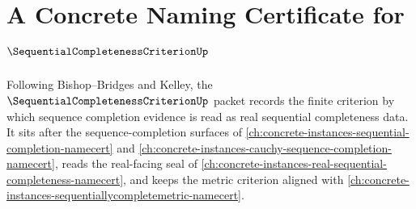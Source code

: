 \chapter{A Concrete Naming Certificate for $\SequentialCompletenessCriterionUp$}
\label{ch:concrete-instances-sequential-completeness-criterion-namecert}

Following Bishop--Bridges and Kelley, the $\SequentialCompletenessCriterionUp$ packet records the finite criterion by which sequence completion evidence is read as real sequential completeness data. It sits after the sequence-completion surfaces of \autoref{ch:concrete-instances-sequential-completion-namecert} and \autoref{ch:concrete-instances-cauchy-sequence-completion-namecert}, reads the real-facing seal of \autoref{ch:concrete-instances-real-sequential-completeness-namecert}, and keeps the metric criterion aligned with \autoref{ch:concrete-instances-sequentiallycompletemetric-namecert}.

